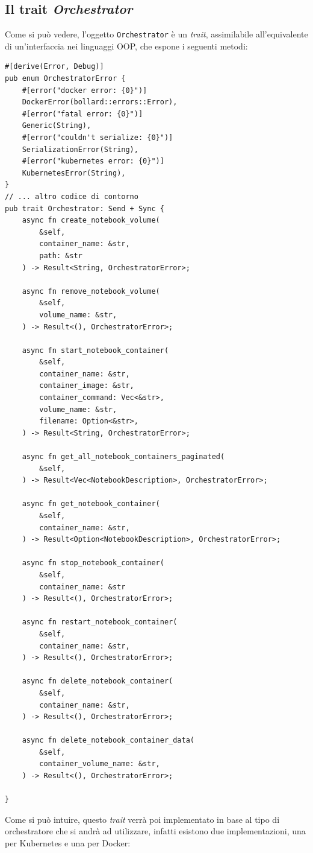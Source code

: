 \subsection{Il trait \textit{Orchestrator}} \label{axum-orchestrator}
Come si può vedere, l'oggetto \verb|Orchestrator| è un \textit{trait}, assimilabile all'equivalente di un'interfaccia nei linguaggi OOP, che espone i seguenti metodi:
\begin{verbatim}
#[derive(Error, Debug)]
pub enum OrchestratorError {
    #[error("docker error: {0}")]
    DockerError(bollard::errors::Error),
    #[error("fatal error: {0}")]
    Generic(String),
    #[error("couldn't serialize: {0}")]
    SerializationError(String),
    #[error("kubernetes error: {0}")]
    KubernetesError(String),
}
// ... altro codice di contorno
pub trait Orchestrator: Send + Sync {
    async fn create_notebook_volume(
        &self, 
        container_name: &str, 
        path: &str
    ) -> Result<String, OrchestratorError>;

    async fn remove_notebook_volume(
        &self, 
        volume_name: &str, 
    ) -> Result<(), OrchestratorError>;

    async fn start_notebook_container(
        &self, 
        container_name: &str,
        container_image: &str,
        container_command: Vec<&str>,
        volume_name: &str,
        filename: Option<&str>,
    ) -> Result<String, OrchestratorError>;

    async fn get_all_notebook_containers_paginated(
        &self, 
    ) -> Result<Vec<NotebookDescription>, OrchestratorError>;

    async fn get_notebook_container(
        &self,
        container_name: &str,
    ) -> Result<Option<NotebookDescription>, OrchestratorError>;

    async fn stop_notebook_container(
        &self,
        container_name: &str
    ) -> Result<(), OrchestratorError>;

    async fn restart_notebook_container(
        &self,
        container_name: &str,
    ) -> Result<(), OrchestratorError>;

    async fn delete_notebook_container(
        &self,
        container_name: &str,
    ) -> Result<(), OrchestratorError>;

    async fn delete_notebook_container_data(
        &self,
        container_volume_name: &str,
    ) -> Result<(), OrchestratorError>;

}
\end{verbatim}
Come si può intuire, questo \textit{trait} verrà poi implementato in base al tipo di orchestratore che si andrà ad utilizzare, infatti esistono due implementazioni, una per Kubernetes e una per Docker:
